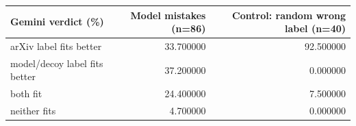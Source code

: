 \begin{tabular}{lrr}
\toprule
Gemini verdict (\%) & Model mistakes (n=86) & Control: random wrong label (n=40) \\
\midrule
arXiv label fits better & 33.700000 & 92.500000 \\
model/decoy label fits better & 37.200000 & 0.000000 \\
both fit & 24.400000 & 7.500000 \\
neither fits & 4.700000 & 0.000000 \\
\bottomrule
\end{tabular}
